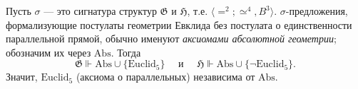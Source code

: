 \documentclass[12pt,a4paper]{article}
\newcommand{\Abs}{\ensuremath{\mathrm{Abs}}\xspace}
\begin{document}
    \begin{example}
        Пусть $\sigma$ --- это сигнатура структур \hyperlink{G-structure-definition}{$\mathfrak{G}$} и \hyperlink{H-structure-definition}{$\mathfrak{H}$}, т.е. $\langle {=}^2; {\simeq}^4, B^3 \rangle$. $\sigma$-пре\-дло\-же\-ния, формализующие постулаты геометрии Евклида без постулата о единственности параллельной прямой, обычно именуют \emph{аксиомами абсолютной геометрии}; обозначим их через $\Abs$. Тогда
        \[
            \mathfrak{G} \Vdash \Abs \cup \{\mathrm{Euclid}_5\}
            \quad \text{ и } \quad
            \mathfrak{H} \Vdash \Abs \cup \{\neg \mathrm{Euclid}_5\}.
        \]
        Значит, \hyperlink{Euclid_5-axiom-definition}{$\mathrm{Euclid}_5$} (аксиома о параллельных) независима от $\Abs$.
    \end{example}
\end{document}
